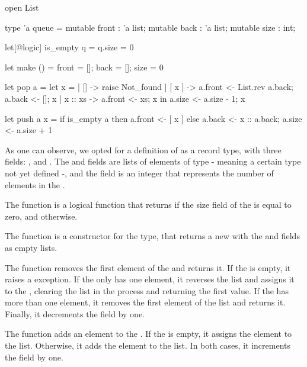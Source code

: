 \begin{gospel}
    open List

    type 'a queue = {
        mutable front : 'a list;
        mutable back : 'a list;
        mutable size : int;
    }

    let[@logic] is_empty q = q.size = 0

    let make () =
    { front = []; back = []; size = 0 }

    let pop a = 
    let x =
        | [] -> raise Not_found
        | [ x ] ->
            a.front <- List.rev a.back;
            a.back <- [];
            x
        | x :: xs ->
            a.front <- xs;
            x
    in
    a.size <- a.size - 1;
    x

    let push a x =
        if is_empty a then a.front <- [ x ] else a.back <- x :: a.back;
        a.size <- a.size + 1
\end{gospel}

As one can observe, we opted for a definition of  as a record type, 
with three fields: ,  and . The  
and  fields are lists of elements of type  - meaning a certain type 
not yet defined -, and the  field is an integer that represents the 
number of elements in the .

The  function is a logical function that returns  if the 
size field of the  is equal to zero, and  otherwise. 

The  function is a constructor for the  type, that returns 
a new  with the  and  fields as empty lists.

The  function removes the first element of the  and returns it. 
If the  is empty, it raises a  exception. If the  
only has one element, it reverses the  list and assigns it to the , 
clearing the  list in the process and returning the first value. If the 
 has more than one element, it removes the first element of the  
list and returns it. Finally, it decrements the  field by one.

The  function adds an element to the . If the  is empty, 
it assigns the element to the  list. Otherwise, it adds the element to the 
 list. In both cases, it increments the  field by one.

